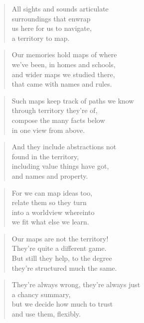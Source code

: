 \documentclass[10pt,a4paper]{article}
\begin{document}
\begin{paracol}{2}
\begin{verse}
All sights and sounds articulate\\
surroundings that enwrap\\
us here for us to navigate,\\
a territory to map.
\end{verse}

\begin{verse}
Our memories hold maps of where\\
we’ve been, in homes and schools,\\
and wider maps we studied there,\\
that came with names and rules.
\end{verse}

\begin{verse}
Such maps keep track of paths we know\\
through territory they’re of,\\
compose the many facts below\\
in one view from above.
\end{verse}

\begin{verse}
And they include abstractions not\\
found in the territory,\\
including value things have got,\\
and names and property.
\end{verse}

\begin{verse}
For we can map ideas too,\\
relate them so they turn\\
into a worldview whereinto\\
we fit what else we learn.
\end{verse}

\begin{verse}
Our maps are not the territory!\\
They’re quite a different game.\\
But still they help, to the degree\\
they’re structured much the same.
\end{verse}

\begin{verse}
They’re always wrong, they’re always just\\
a chancy summary,\\
but we decide how much to trust\\
and use them, flexibly.
\end{verse}


\end{paracol}
\end{document}
